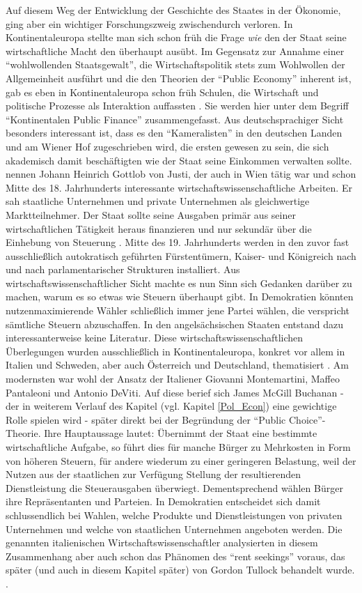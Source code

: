 Auf diesem Weg der Entwicklung der Geschichte des Staates in der Ökonomie, ging aber ein wichtiger Forschungszweig zwischendurch verloren. In Kontinentaleuropa stellte man sich schon früh die Frage \textit{wie} den der Staat seine wirtschaftliche Macht den überhaupt ausübt. Im Gegensatz zur Annahme einer "`wohlwollenden Staatsgewalt"', die Wirtschaftspolitik stets zum Wohlwollen der Allgemeinheit ausführt und die den Theorien der "`Public Economy"' inherent ist, gab es eben in Kontinentaleuropa schon früh Schulen, die Wirtschaft und politische Prozesse als Interaktion auffassten \parencite[S. 2]{Backhaus2005}. Sie werden hier unter dem Begriff "`Kontinentalen Public Finance"' zusammengefasst. Aus deutschsprachiger Sicht besonders interessant ist, dass es den "`Kameralisten"' in den deutschen Landen und am Wiener Hof zugeschrieben wird, die ersten gewesen zu sein, die sich akademisch damit beschäftigten wie der Staat seine Einkommen verwalten sollte. \textcite[S. 7]{Backhaus2005} nennen Johann Heinrich Gottlob von Justi, der auch in Wien tätig war und schon Mitte des 18. Jahrhunderts interessante wirtschaftswissenschaftliche Arbeiten. Er sah staatliche Unternehmen und private Unternehmen als gleichwertige Marktteilnehmer. Der Staat sollte seine Ausgaben primär aus seiner wirtschaftlichen Tätigkeit heraus finanzieren und nur sekundär über die Einhebung von Steuerung \parencite[S. 10]{Backhaus2005}. Mitte des 19. Jahrhunderts werden in den zuvor fast ausschließlich autokratisch geführten Fürstentümern, Kaiser- und Königreich nach und nach parlamentarischer Strukturen installiert. Aus wirtschaftswissenschaftlicher Sicht machte es nun Sinn sich Gedanken darüber zu machen, warum es so etwas wie Steuern überhaupt gibt. In Demokratien könnten nutzenmaximierende Wähler schließlich immer jene Partei wählen, die verspricht sämtliche Steuern abzuschaffen. In den angelsächsischen Staaten entstand dazu interessanterweise keine Literatur. Diese wirtschaftswissenschaftlichen Überlegungen wurden ausschließlich in Kontinentaleuropa, konkret vor allem in Italien und Schweden, aber auch Österreich und Deutschland, thematisiert \parencite[S. 12]{Backhaus2005}. Am modernsten war wohl der Ansatz der Italiener Giovanni Montemartini, Maffeo Pantaleoni und Antonio DeViti. Auf diese berief sich James McGill Buchanan - der in weiterem Verlauf des Kapitel (vgl. Kapitel \ref{Pol_Econ}) eine gewichtige Rolle spielen wird - später direkt bei der Begründung der "`Public Choice"'-Theorie. Ihre Hauptaussage lautet: Übernimmt der Staat eine bestimmte wirtschaftliche Aufgabe, so führt dies für manche Bürger zu Mehrkosten in Form von höheren Steuern, für andere wiederum zu einer geringeren Belastung, weil der Nutzen aus der staatlichen zur Verfügung Stellung der resultierenden Dienstleistung die Steuerausgaben überwiegt. Dementsprechend wählen Bürger ihre Repräsentanten und Parteien. In Demokratien entscheidet sich damit schlussendlich bei Wahlen, welche Produkte und Dienstleistungen von privaten Unternehmen und welche von staatlichen Unternehmen angeboten werden. Die genannten italienischen Wirtschaftswissenschaftler analysierten in diesem Zusammenhang aber auch schon das Phänomen des "`rent seekings"' voraus, das später (und auch in diesem Kapitel später) von Gordon Tullock behandelt wurde. \parencite[S. 16]{Backhaus2005}. 
	
